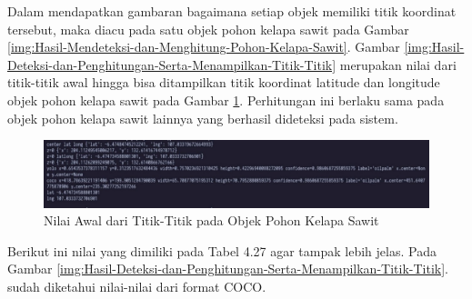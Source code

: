 Dalam mendapatkan gambaran bagaimana setiap objek memiliki titik koordinat tersebut, maka diacu pada satu objek pohon kelapa sawit pada Gambar \ref{img:Hasil-Mendeteksi-dan-Menghitung-Pohon-Kelapa-Sawit}. Gambar \ref{img:Hasil-Deteksi-dan-Penghitungan-Serta-Menampilkan-Titik-Titik} merupakan nilai dari titik-titik awal hingga bisa ditampilkan titik koordinat latitude dan longitude objek pohon kelapa sawit pada Gambar \ref{img:Nilai-Awal-dari-Titik-titik-pada-objek-pohon-kelapa}. Perhitungan ini berlaku sama pada objek pohon kelapa sawit lainnya yang berhasil dideteksi pada sistem.

\begin{figure}[H]
	\vspace{-0.1cm}
	\begin{center}
		\includegraphics[width=1\columnwidth]{bab4/Gambar/Picture39.jpg}
	\end{center}
	\vspace{-0.2cm}
	\captionsetup{justification=centering}
	\caption{Nilai Awal dari Titik-Titik pada Objek Pohon Kelapa Sawit}\label{img:Nilai-Awal-dari-Titik-titik-pada-objek-pohon-kelapa}
\end{figure}

Berikut ini nilai yang dimiliki pada Tabel 4.27 agar tampak lebih jelas. Pada Gambar \ref{img:Hasil-Deteksi-dan-Penghitungan-Serta-Menampilkan-Titik-Titik}. sudah diketahui nilai-nilai dari format COCO.

